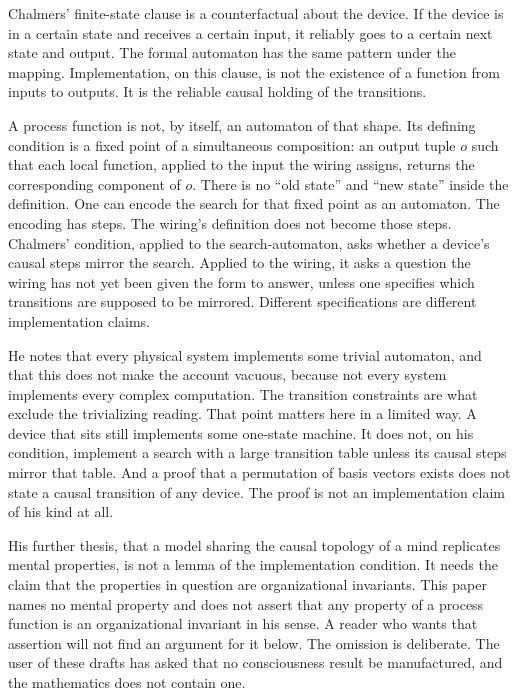 \documentclass[11pt]{article}
\begin{document}
Chalmers' finite-state clause is a counterfactual about the device. If the device is in a certain state and receives a certain input, it reliably goes to a certain next state and output. The formal automaton has the same pattern under the mapping. Implementation, on this clause, is not the existence of a function from inputs to outputs. It is the reliable causal holding of the transitions.

A process function is not, by itself, an automaton of that shape. Its defining condition is a fixed point of a simultaneous composition: an output tuple \(o\) such that each local function, applied to the input the wiring assigns, returns the corresponding component of \(o\). There is no ``old state'' and ``new state'' inside the definition. One can encode the search for that fixed point as an automaton. The encoding has steps. The wiring's definition does not become those steps. Chalmers' condition, applied to the search-automaton, asks whether a device's causal steps mirror the search. Applied to the wiring, it asks a question the wiring has not yet been given the form to answer, unless one specifies which transitions are supposed to be mirrored. Different specifications are different implementation claims.

He notes that every physical system implements some trivial automaton, and that this does not make the account vacuous, because not every system implements every complex computation. The transition constraints are what exclude the trivializing reading. That point matters here in a limited way. A device that sits still implements some one-state machine. It does not, on his condition, implement a search with a large transition table unless its causal steps mirror that table. And a proof that a permutation of basis vectors exists does not state a causal transition of any device. The proof is not an implementation claim of his kind at all.

His further thesis, that a model sharing the causal topology of a mind replicates mental properties, is not a lemma of the implementation condition. It needs the claim that the properties in question are organizational invariants. This paper names no mental property and does not assert that any property of a process function is an organizational invariant in his sense. A reader who wants that assertion will not find an argument for it below. The omission is deliberate. The user of these drafts has asked that no consciousness result be manufactured, and the mathematics does not contain one.
\end{document}
